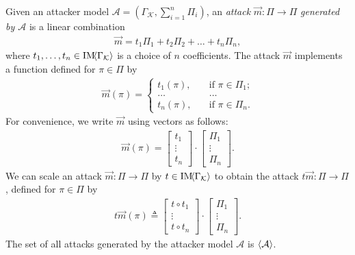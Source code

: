 {{%
\begin{definition}[Attack]
  \label{def:CPSRobustness:Attack}
Given an attacker model $\mathcal{A}=(\Gamma_{\mathcal{K}}, \sum_{i=1}^n\Pi_i)$,
 an \emph{attack} $\vec{m}\colon \Pi\rightarrow \Pi$ \emph{generated by $\mathcal{A}$} is a linear combination
\begin{align}
  \vec{m}=t_1\Pi_1 + t_2\Pi_2 + \ldots + t_n\Pi_n,
\end{align} 
where $t_1, \ldots, t_n\in\text{IM}\!{{\left<\Gamma_{\mathcal{K}}\right>}}$ is a choice of $n$ coefficients. The attack $\vec{m}$ implements a function defined for $\pi\in \Pi$ by
\begin{align}
  \label{eq:AttackVector}
  \vec{m}(\pi)=
    \begin{cases}
      t_1(\pi), &\quad\text{if $\pi\in \Pi_1$;}\\
      \ldots&\quad\ldots\\
      t_n(\pi), &\quad\text{if $\pi\in \Pi_n$.}
    \end{cases}
\end{align}
For convenience, we write $\vec{m}$ using vectors as follows: 
\begin{align}
  \vec{m}(\pi)=
  \begin{bmatrix}
    t_{1} \\
    \vdots \\
    t_{n}
  \end{bmatrix}
  \cdot
  \begin{bmatrix}
    \Pi_{1} \\
    \vdots \\
    \Pi_{n}
  \end{bmatrix}.
\end{align} 
We can scale an attack $\vec{m}\colon \Pi\rightarrow \Pi$ by $t\in \text{IM}\!{{\left<\Gamma_{\mathcal{K}}\right>}}$ to obtain the attack $t\vec{m}\colon \Pi\rightarrow \Pi$, defined for $\pi\in \Pi$ by
\begin{align}
  t\vec{m}(\pi)\triangleq
  \begin{bmatrix}
    t\circ t_{1} \\
    \vdots \\
    t\circ t_{n}
  \end{bmatrix}
  \cdot
  \begin{bmatrix}
    \Pi_{1} \\
    \vdots \\
    \Pi_{n}
  \end{bmatrix}.
\end{align} 
The set of all attacks generated by the attacker model $\mathcal{A}$ is ${{\left<\mathcal{A}\right>}}$.


\end{definition}}}
